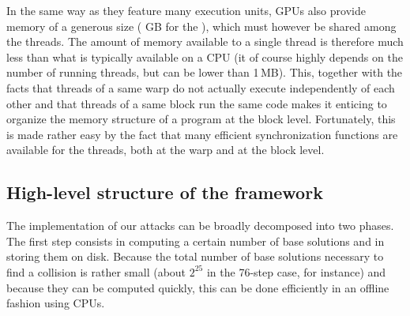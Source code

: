 \bigskip

In the same way as they feature many execution units, GPUs also provide
memory of a generous size ( GB for the \gtx), which must however be shared among the threads. The amount of memory available to a single thread
is therefore much less than what is typically available on a CPU (it of course highly depends on the number of
running threads, but can be lower than 1\,MB). This, together with the facts that threads of a same warp do not actually execute
independently of each other and that threads of a same block run the same code makes it enticing to organize the memory
structure of a program at the block level. Fortunately, this is made rather easy by the fact that many efficient
synchronization functions are available for the threads, both at the warp and at the block level.

\subsection{High-level structure of the framework}

The implementation of our attacks can be broadly decomposed into two phases. The first step consists in computing a certain number
of base solutions and in storing them on disk.
Because the total number of base solutions necessary to find a collision
is rather small (about $2^{25}$ in the 76-step case, for instance) and because they can be computed
quickly, this can be done efficiently in an offline fashion using CPUs.

